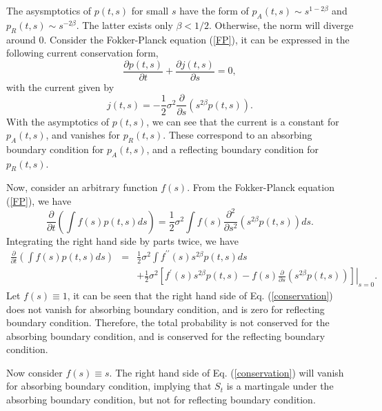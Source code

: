 \documentclass[12pt]{article}
\begin{document}
  The asysmptotics of $p(t,s)$ for small $s$ have the form of $p_A(t,s)\sim s^{1-2\beta}$ and $p_R(t,s)\sim s^{-2\beta}$.
  The latter exists only $\beta < 1/2$. Otherwise, the norm will diverge around 0.
  Consider the Fokker-Planck equation (\ref{FP}), it can be expressed in the following current conservation form,
  \begin{equation}
    \frac{\partial p(t,s)}{\partial t} + \frac{\partial j(t,s)}{\partial s} = 0,
  \end{equation}
  with the current given by
  \begin{equation}
    j(t,s) = -\frac{1}{2}\sigma^2\frac{\partial }{\partial s}\left(s^{2\beta}p(t,s)\right).
  \end{equation}
  With the asymptotics of $p(t,s)$, we can see that the current is a constant for $p_A(t,s)$, and vanishes for $p_R(t,s)$.
  These correspond to an absorbing boundary condition for $p_A(t,s)$, and a reflecting boundary condition for $p_R(t,s)$.

  Now, consider an arbitrary function $f(s)$. From the Fokker-Planck equation (\ref{FP}), we
  have
  \begin{equation}
    \frac{\partial}{\partial t}\left(\int f(s)p(t,s)ds\right) = \frac{1}{2}\sigma^2\int f(s)\frac{\partial^2}{\partial s^2}
    \left(s^{2\beta}p(t,s)\right)ds.
  \end{equation}
  Integrating the right hand side by parts twice, we have
  \begin{eqnarray}
    \frac{\partial}{\partial t}\left(\int f(s)p(t,s)ds\right) &=& \frac{1}{2}\sigma^2\int f^{\prime\prime}(s)s^{2\beta}p(t,s)ds\nonumber \\
          && + \left . \frac{1}{2}\sigma^2\left[f^{\prime}(s)s^{2\beta}p(t,s) - f(s)\frac{\partial}{\partial s}
                \left(s^{2\beta}p(t,s)\right)\right]\right|_{s=0}.
    \label{conservation}
  \end{eqnarray}
  Let $f(s)\equiv 1$, it can be seen that the right hand side of Eq. (\ref{conservation}) does not vanish for absorbing
  boundary condition, and is zero for reflecting boundary condition. Therefore, the total probability is not conserved for
  the absorbing boundary condition, and is conserved for the reflecting boundary condition.

  Now consider $f(s)\equiv s$. The right hand side of Eq. (\ref{conservation}) will vanish for absorbing
  boundary condition, implying that $S_t$ is a martingale under the absorbing boundary condition, but not for reflecting
  boundary condition.
\end{document}
